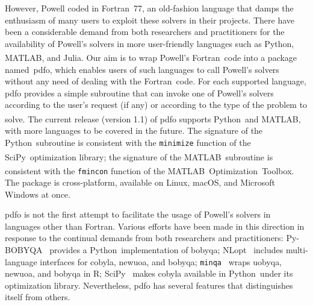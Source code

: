 \documentclass[11pt,draft]{article}
\numberwithin{equation}{section}
\def\fortran{\mbox{Fortran}}
\def\julia{\mbox{Julia}}
\def\matlab{\mbox{MATLAB\textsuperscript{\textregistered}}}
\def\matlabopt{\mbox{\matlab\ Optimization Toolbox\textsuperscript{\texttrademark}}}
\def\minqa{\mbox{\texttt{minqa}}}
\def\nlopt{\mbox{NLopt}}
\def\pybobyqa{\mbox{Py-BOBYQA}}
\def\python{\mbox{Python}}
\def\rlang{\mbox{R}}
\def\scipy{\mbox{SciPy}}
\begin{document}
However, Powell coded in \fortran\ 77, an old-fashion language that damps the enthusiasm of many users to exploit these solvers in their projects.
There have been a considerable demand from both researchers and practitioners for the availability of Powell's solvers in more user-friendly languages such as \python, \matlab, and \julia.
Our aim is to wrap Powell's \fortran\ code into a package named~\gls{pdfo}, which enables users of such languages to call Powell's solvers without any need of dealing with the \fortran\ code.
For each supported language, \gls{pdfo} provides a simple subroutine that can invoke one of Powell's solvers according to the user's request (if any) or according to the type of the problem to solve. The current release (version 1.1) of \gls{pdfo} supports \python\ and \matlab, with more languages to be covered in the future.
The signature of the \python\ subroutine is consistent with the \texttt{minimize} function of the \scipy\ optimization library;
the signature of the \matlab\ subroutine is consistent with the \texttt{fmincon} function of the \matlabopt.
The package is cross-platform, available on Linux, macOS, and Microsoft Windows at once.

\gls{pdfo} is not the first attempt to facilitate the usage of Powell's solvers in languages other than \fortran.
Various efforts have been made in this direction in response to the continual demands from both researchers and practitioners: \pybobyqa~\cite{Cartis_Etal_2019} provides a \python\ implementation of \gls{bobyqa}; \nlopt~\cite{Johnson_2019} includes multi-language interfaces for \gls{cobyla}, \gls{newuoa}, and \gls{bobyqa}; \minqa~\cite{Bates_Etal_2014} wraps \gls{uobyqa}, \gls{newuoa}, and \gls{bobyqa} in \rlang; \scipy~\cite{Virtanen_Etal_2020} makes \gls{cobyla} available in \python\ under its optimization library. Nevertheless, \gls{pdfo} has several features that distinguishes itself from others.
\end{document}
